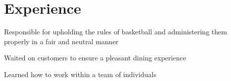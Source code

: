 \documentclass[letterpaper]{deedy-resume} %
\begin{document}
\begin{minipage}[t]{0.66\textwidth} %

\section{Experience}


\vspace{\topsep} %
\begin{tightitemize}
\item Responsible for upholding the rules of basketball and administering
them properly in a fair and neutral manner
\end{tightitemize}

\sectionspace %



\begin{tightitemize}
\item Waited on customers to ensure a pleasant dining experience
\item Learned how to work within a team of individuals
\end{tightitemize}


\end{minipage}
\end{document}
